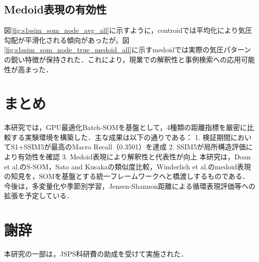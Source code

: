 \documentclass{jarticle}
\theoremstyle{definition}
\begin{document}
\subsection{Medoid表現の有効性}
図\ref{fig:s1ssim_som_node_avg_all}に示すように，centroidでは平均化により気圧勾配が平滑化される傾向があったが，図\ref{fig:s1ssim_som_node_true_medoid_all}に示すmedoidでは実際の気圧パターンの鋭い特徴が保持された．これにより，現業での解釈性と事例検索への応用可能性が高まった．
\section{まとめ}
本研究では，GPU最適化Batch-SOMを基盤として，4種類の距離指標を厳密に比較する実験環境を構築した．主な成果は以下の通りである：
1. 検証期間においてS1+SSIM5が最高のMacro Recall（0.3501）を達成
2. SSIM5が局所構造評価により有効性を確認
3. Medoid表現により解釈性と代表性が向上
本研究は，Doan et al.\cite{doan2021s}のS-SOM，Sato and Kusaka\cite{SATOTakuto20212021-047}の類似度比較，Winderlich et al.\cite{winderlich2024classification}のmedoid表現の知見を，SOMを基盤とする統一フレームワークへと橋渡しするものである．今後は，多変量化や季節別学習，Jensen-Shannon距離による循環表現評価等への拡張を予定している．
\section*{謝辞}
本研究の一部は，JSPS科研費の助成を受けて実施された．



\end{document}
